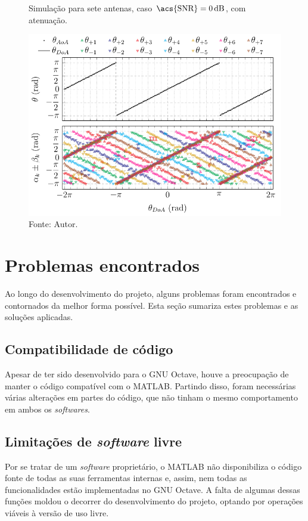 \begin{figure}[H]
    \centering
    \caption{Simulação para sete antenas, caso $\text{\acs{SNR}} = \SI{0}{\deci\bel}$, com atenuação.}
    \label{fig:simul_POLY_7_R_50_SNR_1_ATT}
    \includegraphics{../pictures/simul_POLY_7_R_50_SNR_1_ATT.pdf}
    \caption*{Fonte: Autor.}
\end{figure}

\section{Problemas encontrados}

Ao longo do desenvolvimento do projeto, alguns problemas foram encontrados e contornados da melhor forma possível.
Esta seção sumariza estes problemas e as soluções aplicadas.

\subsection{Compatibilidade de código}

Apesar de ter sido desenvolvido para o GNU Octave, houve a preocupação de manter o código compatível com o MATLAB.
Partindo disso, foram necessárias várias alterações em partes do código, que não tinham o mesmo comportamento em ambos os \textit{softwares}.

\subsection{Limitações de \textit{software} livre}

Por se tratar de um \textit{software} proprietário, o MATLAB não disponibiliza o código fonte de todas as suas ferramentas internas e, assim, nem todas as funcionalidades estão implementadas no GNU Octave.
A falta de algumas dessas funções moldou o decorrer do desenvolvimento do projeto, optando por operações viáveis à versão de uso livre.

